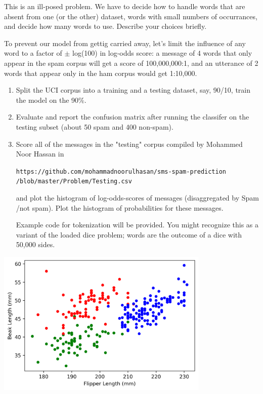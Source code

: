 \documentclass[12pt]{book}
\theoremstyle{definition}
\begin{document}
\begin{enumerate}
This is an ill-posed problem.  We have to decide how to handle words that are absent from one (or the other) dataset, words with small numbers of occurrances, and decide how many words to use.   Describe your choices briefly.

To prevent our model from gettig carried away, let's limit the influence of any word to a factor of $\pm$ log(100) in log-odds score:  a message of 4 words that only appear in the spam corpus will get a score of 100,000,000:1, and an utterance of 2 words that appear only in the ham corpus would get 1:10,000.  

\begin{enumerate}[label=(\alph*)]
\item Split the UCI corpus into a training and a testing dataset, say, 90/10, train the model on the 90\%.

\item Evaluate and report the confusion matrix after running the classifer on the testing subset (about 50 spam and 400 non-spam).

\item
Score all of the messages in the "testing" corpus compiled by Mohammed Noor Hassan in 

\texttt{https://github.com/mohammadnoorulhasan/sms-spam-prediction \\
/blob/master/Problem/Testing.csv}

and plot the histogram of log-odds-scores of messages (disaggregated by Spam /not spam).  Plot the histogram of probabilities for these messages.

Example code for tokenization will be provided.  You might recognize this as a variant of the loaded dice problem; words are the outcome of a dice with 50,000 sides.

\end{enumerate}
\includegraphics[width=4in]{PENGUIN.png}


\end{enumerate}
\end{document}
